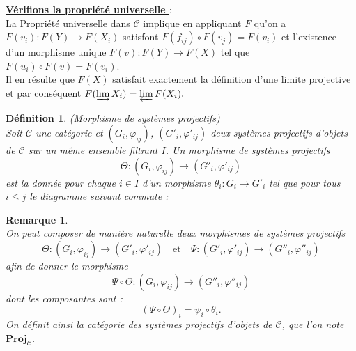 \documentclass[a4paper, 14pt]{report}
\newtheorem{definition}{Définition}[section]
\newtheorem{remark}{Remarque}[section]
\begin{document}
\begin{onehalfspace}
{			\textbf{\underline{Vérifions la propriété universelle }}: \\
			
			La Propriété universelle dans \( \mathcal{C} \) implique en appliquant \( F \) qu'on a \( F(v_i): F(Y) \to F(X_i) \) satisfont \( F(f_{ij}) \circ F(v_j) = F(v_i) \) et l'existence d'un morphisme unique \( F(v): F(Y) \to F(X) \) tel que \( F(u_i) \circ F(v) = F(v_i) \).\\
			
			Il en résulte que \( F(X) \) satisfait exactement la définition d’une limite projective et par conséquent \(F(\varinjlim X_i) = \varprojlim F(X_i).\)\\
			
			
			
			
			\begin{definition} (Morphisme de systèmes projectifs) \cite{guglielmetti2025profinite}\\
				Soit $\mathcal{C}$ une catégorie et $(G_i, \varphi_{ij})$, $(G'_i, \varphi'_{ij})$ deux systèmes projectifs d'objets de $\mathcal{C}$ sur un même ensemble filtrant $I$. Un morphisme de systèmes projectifs 
				\[
				\Theta : (G_i, \varphi_{ij}) \longrightarrow (G'_i, \varphi'_{ij})
				\]
				est la donnée pour chaque $i \in I$ d'un morphisme $\theta_i : G_i \to G'_i$ tel que pour tous $i \leq j$ le diagramme suivant commute :
				
				
				\begin{center}
				\end{center}
				
			\end{definition}
			
			
			\begin{remark} \cite{guglielmetti2025profinite}\\
				On peut composer de manière naturelle deux morphismes de systèmes projectifs
				\[
				\Theta : (G_i, \varphi_{ij}) \longrightarrow (G'_i, \varphi'_{ij}) \quad \text{et} \quad \Psi : (G'_i, \varphi'_{ij}) \longrightarrow (G''_i, \varphi''_{ij})
				\]
				afin de donner le morphisme
				\[
				\Psi \circ \Theta : (G_i, \varphi_{ij}) \longrightarrow (G''_i, \varphi''_{ij})
				\]
				dont les composantes sont :
				\[
				(\Psi \circ \Theta)_i = \psi_i \circ \theta_i.
				\]
				On définit ainsi la catégorie des systèmes projectifs d'objets de $\mathcal{C}$, que l'on note $\mathbf{Proj}_{\mathcal{C}}$.
			\end{remark}
			
}
\end{onehalfspace}
\end{document}
